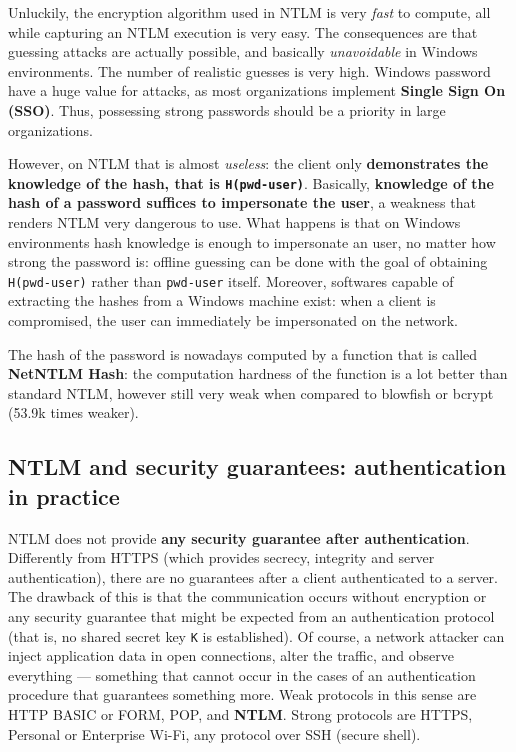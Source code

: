 \documentclass[10pt]{\classname}
\begin{document}
Unluckily, the encryption algorithm used in NTLM is very \emph{fast} to
compute, all while capturing an NTLM execution is very easy. The consequences
are that guessing attacks are actually possible, and basically
\emph{unavoidable} in Windows environments. The number of realistic guesses is
very high. Windows password have a huge value for attacks, as most
organizations implement \textbf{Single Sign On (SSO)}. Thus, possessing strong
passwords should be a priority in large organizations.

However, on NTLM that is almost \emph{useless}: the client only
\textbf{demonstrates the knowledge of the hash, that is \texttt{H(pwd-user)}}.
Basically, \textbf{knowledge of the hash of a password suffices to impersonate
the user}, a weakness that renders NTLM very dangerous to use. What happens is
that on Windows environments hash knowledge is enough to impersonate an user,
no matter how strong the password is: offline guessing can be done with the
goal of obtaining \texttt{H(pwd-us\-er)} rather than \texttt{pwd-user} itself.
Moreover, softwares capable of extracting the hashes from a Windows machine
exist: when a client is compromised, the user can immediately be impersonated
on the network.

The hash of the password is nowadays computed by a function that is called
\textbf{NetNTLM Hash}: the computation hardness of the function is a lot better
than standard NTLM, however still very weak when compared to blowfish or bcrypt
(53.9k times weaker).

\subsection{NTLM and security guarantees: authentication in practice}

NTLM does not provide \textbf{any security guarantee after authentication}.
Differently from HTTPS (which provides secrecy, integrity and server
authentication), there are no guarantees after a client authenticated to a
server. The drawback of this is that the communication occurs without
encryption or any security guarantee that might be expected from an
authentication protocol (that is, no shared secret key \texttt{K} is
established). Of course, a network attacker can inject application data in open
connections, alter the traffic, and observe everything --- something that cannot
occur in the cases of an authentication procedure that guarantees something
more. Weak protocols in this sense are HTTP BASIC or FORM, POP, and
\textbf{NTLM}. Strong protocols are HTTPS, Personal or Enterprise Wi\--Fi, any
protocol over SSH (secure shell).
\end{document}
